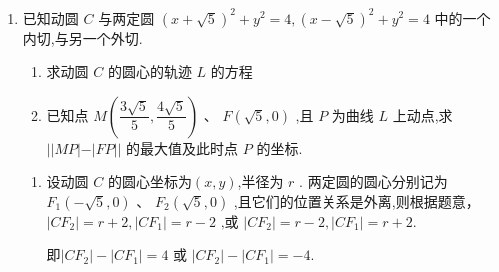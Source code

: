 \begin{enumerate}
\begin{jieda}
    \end{jieda}
    \item 已知动圆 $C$ 与两定圆 ${\left( x + \sqrt{5}\right) }^{2} + {y}^{2} = 4,{\left( x - \sqrt{5}\right) }^{2} + {y}^{2} = 4$ 中的一个内切,与另一个外切.
    \begin{enumerate}
        \item 求动圆 $C$ 的圆心的轨迹 $L$ 的方程
        \item 已知点 $M\left( {\dfrac{3\sqrt{5}}{5},\dfrac{4\sqrt{5}}{5}}\right)$ 、 $F\left( {\sqrt{5},0}\right)$ ,且 $P$ 为曲线 $L$ 上动点,求 $\left| \right| {MP}\left| -\right| {FP}\left| \right|$ 的最大值及此时点 $P$ 的坐标.
    \end{enumerate}
    \begin{jieda}
        \begin{enumerate}
            \item 设动圆 $C$ 的圆心坐标为$(x, y)$,半径为 $r$ . 两定圆的圆心分别记为 ${F}_{1}\left( {-\sqrt{5},0}\right)$ 、 ${F}_{2}\left( {\sqrt{5},0}\right)$ ,且它们的位置关系是外离,则根据题意，$\left| {C{F}_{2}}\right|  = r + 2,\left| {C{F}_{1}}\right|  = r - 2\text{ ,或 }\left| {C{F}_{2}}\right|  = r - 2,\left| {C{F}_{1}}\right|  = r + 2$.
            
            即$\left| {C{F}_{2}}\right|  - \left| {C{F}_{1}}\right|  = 4\text{ 或 }\left| {C{F}_{2}}\right|  - \left| {C{F}_{1}}\right|  = - 4.$
            

\end{enumerate}
\end{jieda}
\end{enumerate}
